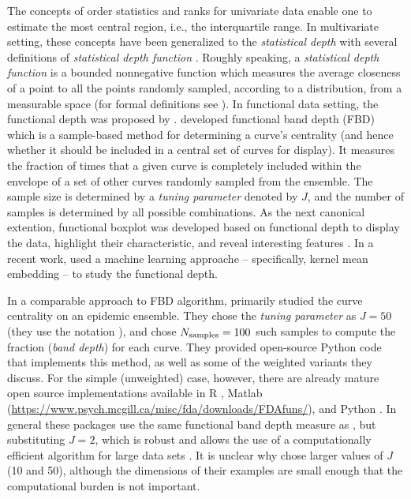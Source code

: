 \documentclass[fleqn,10pt,lineno]{wlpeerj}
\begin{document}
The concepts of order statistics and ranks for univariate data enable one to estimate the most central region, i.e., the interquartile range. In multivariate setting, these concepts have been generalized to the \emph{statistical depth} with several definitions of \emph{statistical depth function} \citep{mahalanobis1936generalized, tukey1975mathematics, oja1983descriptive, liu1990notion, singh1991notion, vardi2000multivariate, zuo2003projection}. 
Roughly speaking, a \emph{statistical depth function} is a bounded nonnegative function which measures the average closeness of a point to all the points randomly sampled, according to a distribution, from a measurable space (for formal definitions see \citep{zuo2000general}).
In functional data setting, the functional depth was proposed by \cite{fraiman2001trimmed}. 
 \cite{lopez2007depth} developed functional band depth (FBD) which is a sample-based method for determining a curve's centrality (and hence whether it should be included in a central set of curves for display). It measures the fraction of times that a given curve is completely included within the envelope of a set of other curves randomly sampled from the ensemble. The sample size is determined by a \emph{tuning parameter} denoted by $J$, and the number of samples is determined by all possible combinations. As the next canonical extention, functional boxplot was developed based on functional depth to display the data, highlight their characteristic, and reveal interesting features \citep{sun2011functional,sun2012exact}. In a recent work, \cite{wynne2021statistical} used a machine learning approache -- specifically, kernel mean embedding -- to study the functional depth.

In a comparable approach to FBD algorithm, \juul primarily studied the curve centrality on an epidemic ensemble. They chose the \emph{tuning parameter} as $J=50$ (they use the notation \ncurve), and chose $N_{\textrm{samples}}=100$ such samples to compute the fraction (\emph{band depth}) for each curve. They provided open-source Python code that implements this method, as well as some of the weighted variants they discuss. For the simple (unweighted) case, however, there are already mature open source implementations available in R \citep{fda_pkg,roahd}, Matlab (\url{https://www.psych.mcgill.ca/misc/fda/downloads/FDAfuns/}), and Python \citep{seabold2010statsmodels}. In general these packages use the same functional band depth measure as \juul, but substituting $J=2$, which is robust \citep{lopez2009concept} and allows the use of a computationally efficient algorithm for large data sets \citep{sun2012exact}. It is unclear why \juul chose larger values of $J$ (10 and 50), although the dimensions of their examples are small enough that the computational burden is not important.
\end{document}
